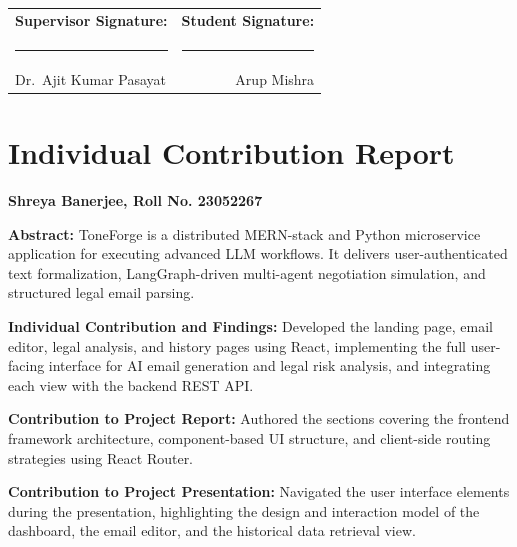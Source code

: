 \documentclass[12pt,a4paper]{report}
\begin{document}
\vspace{2cm}
\noindent
\begin{tabular*}{\textwidth}{@{\extracolsep{\fill}}lr}
	\textbf{Supervisor Signature:} & \textbf{Student Signature:} \\[1.8cm]
	\rule{6cm}{0.4pt} & \rule{6cm}{0.4pt} \\
	Dr.\ Ajit Kumar Pasayat & Arup Mishra \\
\end{tabular*}

\clearpage
\chapter*{Individual Contribution Report}
\begin{center}
	{\large \textbf{Shreya Banerjee, Roll No. 23052267}}\\[0.5cm]
\end{center}

\vspace{0.5cm}
\noindent \textbf{Abstract:}
ToneForge is a distributed MERN-stack and Python microservice application for executing advanced LLM workflows. It delivers user-authenticated text formalization, LangGraph-driven multi-agent negotiation simulation, and structured legal email parsing.

\vspace{0.5cm}
\noindent \textbf{Individual Contribution and Findings:}
Developed the landing page, email editor, legal analysis, and history pages using React, implementing the full user-facing interface for AI email generation and legal risk analysis, and integrating each view with the backend REST API.

\vspace{0.5cm}
\noindent \textbf{Contribution to Project Report:}
Authored the sections covering the frontend framework architecture, component-based UI structure, and client-side routing strategies using React Router.

\vspace{0.5cm}
\noindent \textbf{Contribution to Project Presentation:}
Navigated the user interface elements during the presentation, highlighting the design and interaction model of the dashboard, the email editor, and the historical data retrieval view.
\end{document}
